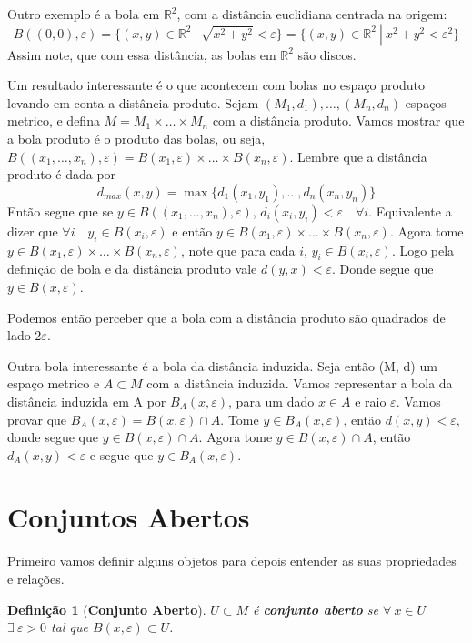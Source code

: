 \documentclass{article}
\newtheorem*{definition}{Definição}
\begin{document}
Outro exemplo é a bola em $\mathbb{R}^2$, com a distância euclidiana centrada na origem:
\[B((0, 0), \varepsilon) = \{ (x,y) \in \mathbb{R}^2 \: | \: \sqrt{x^2 + y^2} < \varepsilon\} = \{ (x,y) \in \mathbb{R}^2 \: | \: x^2 + y^2 < \varepsilon^2\}\]
Assim note, que com essa distância, as bolas em $\mathbb{R}^2$ são discos.

Um resultado interessante é o que acontecem com bolas no espaço produto levando em conta a distância produto.
Sejam $(M_1, d_1), \dots ,(M_n, d_n)$ espaços metrico, e defina $M = M_1 \times \dots \times M_n $ com a distância produto.
Vamos mostrar que a bola produto é o produto das bolas, ou seja, $B((x_1, \dots, x_n), \varepsilon) = B(x_1, \varepsilon) \times \dots \times B(x_n, \varepsilon)$.
Lembre que a distância produto é dada por 
\[d_{max}(x, y) = \max\{d_1(x_1, y_1), \dots, d_n(x_n, y_n)\}\]
Então segue que se $y \in B((x_1, \dots, x_n), \varepsilon)$, $d_i(x_i, y_i) < \varepsilon \quad \forall i$.
Equivalente a dizer que $\forall i \quad y_i \in B(x_i, \varepsilon)$ e então $y \in  B(x_1, \varepsilon) \times \dots \times  B(x_n, \varepsilon)$.
Agora tome $y \in  B(x_1, \varepsilon) \times \dots \times  B(x_n, \varepsilon)$, note que para cada $i$, $y_i \in B(x_i, \varepsilon)$.
Logo pela definição de bola e da distância produto vale $d(y, x) < \varepsilon$. Donde segue que $y \in B(x, \varepsilon)$.

Podemos então perceber que a bola com a distância produto são quadrados de lado $2 \varepsilon$.

Outra bola interessante é a bola da distância induzida. Seja então (M, d) um espaço metrico e $A \subset M$ 
com a distância induzida. Vamos representar a bola da distância induzida em A por $B_A(x, \varepsilon)$,
para um dado $x \in A$ e raio $\varepsilon$. Vamos provar que $B_A(x, \varepsilon) = B(x, \varepsilon) \cap A$.
Tome $y \in B_A(x, \varepsilon)$, então $d(x, y) < \varepsilon$, donde segue que $y \in B(x, \varepsilon) \cap A$.
Agora tome $y \in B(x, \varepsilon) \cap A$, então $d_A(x, y) < \varepsilon$ e segue que $y \in B_A(x, \varepsilon)$.

\section*{Conjuntos Abertos}

Primeiro vamos definir alguns objetos para depois entender as suas propriedades e relações.

\begin{definition}[\textbf{Conjunto Aberto}]
    $U \subset M$ é \textbf{conjunto aberto} se $\forall \: x \in U$ $\exists \: \varepsilon > 0$ tal que $B(x, \varepsilon) \subset U$.
\end{definition}
\end{document}
